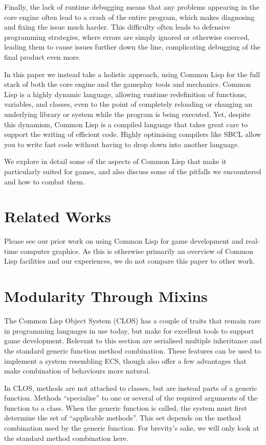 \documentclass[a4paper]{paper}
\begin{document}
Finally, the lack of runtime debugging means that any problems appearing in the core engine often lead to a crash of the entire program, which makes diagnosing and fixing the issue much harder. This difficulty often leads to defensive programming strategies, where errors are simply ignored or otherwise coerced, leading them to cause issues further down the line, complicating debugging of the final product even more.

In this paper we instead take a holistic approach, using Common Lisp for the full stack of both the core engine and the gameplay tools and mechanics. Common Lisp is a highly dynamic language, allowing runtime redefinition of functions, variables, and classes, even to the point of completely reloading or changing an underlying library or system while the program is being executed. Yet, despite this dynamism, Common Lisp is a compiled language that takes great care to support the writing of efficient code. Highly optimising compilers like SBCL allow you to write fast code without having to drop down into another language.

We explore in detail some of the aspects of Common Lisp that make it particularly suited for games, and also discuss some of the pitfalls we encountered and how to combat them.

\section{Related Works}
Please see our prior work on using Common Lisp for game development and real-time computer graphics\cite{hafner2018shader}\cite{hafner2019shader}. As this is otherwise primarily an overview of Common Lisp facilities and our experiences, we do not compare this paper to other work.

\section{Modularity Through Mixins}
The Common Lisp Object System (CLOS) has a couple of traits that remain rare in programming languages in use today, but make for excellent tools to support game development. Relevant to this section are serialised multiple inheritance and the standard generic function method combination. These features can be used to implement a system resembling ECS, though also offer a few advantages that make combination of behaviours more natural.

In CLOS, methods are not attached to classes, but are instead parts of a generic function. Methods ``specialise'' to one or several of the required arguments of the function to a class. When the generic function is called, the system must first determine the set of ``applicable methods''. This set depends on the method combination used by the generic function. For brevity's sake, we will only look at the standard method combination here.
\end{document}
